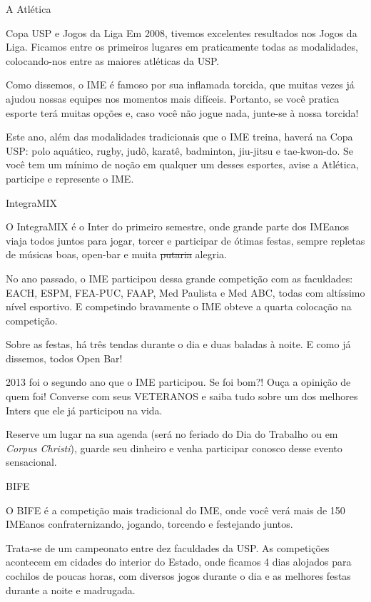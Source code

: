\begin{secao}{A Atlética}
\begin{subsecao}{Copa USP e Jogos da Liga}
Em 2008, tivemos excelentes resultados nos Jogos da Liga. Ficamos entre os
primeiros lugares em praticamente todas as modalidades, colocando-nos entre as
maiores atléticas da USP.

Como dissemos, o IME é famoso por sua inflamada torcida, que muitas vezes já
ajudou nossas equipes nos momentos mais difíceis. Portanto, se você pratica
esporte terá muitas opções e, caso você não jogue nada, junte-se à nossa torcida!

Este ano, além das modalidades tradicionais que o IME treina, haverá na Copa 
USP: polo aquático, rugby, judô, karatê, badminton, jiu-jitsu e tae-kwon-do. Se 
você tem um mínimo de noção em qualquer um desses esportes, avise a Atlética,
participe e represente o IME.

\end{subsecao}
\begin{subsecao}{IntegraMIX}

O IntegraMIX é o Inter do primeiro semestre, onde grande parte dos IMEanos
viaja todos juntos para jogar, torcer e participar de ótimas festas, sempre
repletas de músicas boas, open-bar e muita \sout{putaria} alegria.

No ano passado, o IME participou dessa grande competição com as faculdades:
EACH, ESPM, FEA-PUC, FAAP, Med Paulista e Med ABC, todas com altíssimo nível
esportivo. E competindo bravamente o IME obteve a quarta colocação na
competição.

Sobre as festas, há três tendas durante o dia e duas baladas à noite.
E como já dissemos, todos Open Bar!

2013 foi o segundo ano que o IME participou. Se foi bom?! Ouça a opinição de 
quem foi! Converse com seus VETERANOS e saiba tudo sobre um dos melhores Inters
que ele já participou na vida.

Reserve um lugar na sua agenda (será no feriado do Dia do Trabalho ou em
\textit{Corpus Christi}), guarde seu dinheiro e venha participar conosco 
desse evento sensacional.


\end{subsecao}
\begin{subsecao}{BIFE}

O BIFE é a competição mais tradicional do IME, onde você verá mais de 150 
IMEanos confraternizando, jogando, torcendo e festejando juntos.

Trata-se de um campeonato entre dez faculdades da USP. As competições acontecem em cidades do interior do Estado, onde ficamos 4 dias
alojados para cochilos de poucas horas, com diversos jogos durante o dia e as
melhores festas durante a noite e madrugada.


\end{subsecao}
\end{secao}
